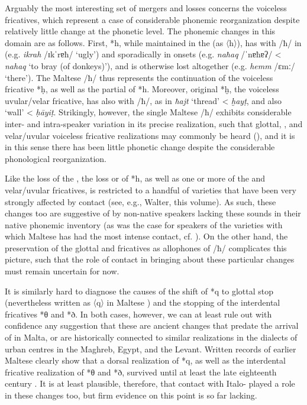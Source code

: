 \documentclass[output=paper]{langsci/langscibook}
\begin{document}
Arguably the most interesting set of mergers and losses concerns the voiceless fricatives, which represent a case of considerable phonemic reorganization despite relatively little change at the phonetic level. The phonemic changes in this domain are as follows. First, *h, while maintained in the  (as 〈h〉), has  with /ħ/ in  (e.g. \textit{ikrah} /ɪkˈrɐħ/ `ugly') and sporadically in onsets (e.g. \textit{naħaq} /ˈnɐħɐʔ/ < \textit{nahaq} `to bray (of donkeys)'), and is otherwise lost altogether (e.g. \textit{hemm} /ɛmː/ `there'). The Maltese  /ħ/ thus represents the continuation of the voiceless  fricative *\d{h}, as well as the partial  of *h. Moreover, original *ḫ, the voiceless uvular/velar fricative, has also  with /ħ/, as in \textit{ħajt} `thread' < \textit{ḫay\d{t}}, and also `wall' < \textit{\d{h}\={a}yi\d{t}}. Strikingly, however, the single Maltese  /ħ/ exhibits considerable inter- and intra-speaker variation in its precise realization, such that glottal, , and velar/uvular voiceless fricative realizations may commonly be heard (\citealt[301]{BorgAzzopardi-Alexander1997}), and it is in this sense there has been little phonetic change despite the considerable phonological reorganization.

Like the loss of the , the loss or  of *h, as well as one or more of the  and velar/uvular fricatives, is restricted to a handful of  varieties that have been very strongly affected by contact (see, e.g., Walter, this volume). As such, these changes too are suggestive of  by non-native speakers lacking these sounds in their native phonemic inventory (as was the case for speakers of the  varieties with which Maltese has had the most intense contact, cf. \citealt[141--142] {Loporcaro2011}). On the other hand, the preservation of the glottal and  fricatives as allophones of /ħ/ complicates this picture, such that the role of contact in bringing about these particular changes must remain uncertain for now.

It is similarly hard to diagnose the causes of the shift of *q to glottal stop (nevertheless written as 〈q〉 in Maltese ) and the stopping of the interdental fricatives *θ and *ð. In both cases, however, we can at least rule out with confidence any suggestion that these are ancient changes that predate the arrival of  in Malta, or are historically connected to similar realizations in the  dialects of urban centres in the Maghreb, Egypt, and the Levant. Written records of earlier Maltese clearly show that a dorsal realization of *q, as well as the interdental fricative realization of *θ and *ð, survived until at least the late eighteenth century \citep{Avram2012,Avram2014Maltese}. It is at least plausible, therefore, that contact with Italo- played a role in these changes too, but firm evidence on this point is so far lacking.
\end{document}
